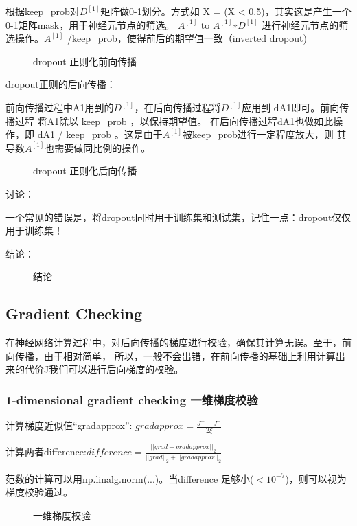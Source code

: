 \documentclass[UTF8]{ctexart}
\begin{document}
根据keep\_prob对$D^{[1]}$矩阵做0-1划分。方式如 X = (X < 0.5)，其实这是产生一个0-1矩阵mask，用于神经元节点的筛选。
$A^{[1]}$ to $A^{[1]}$∗$D^{[1]}$ 进行神经元节点的筛选操作。$A^{[1]}$ /keep\_prob，使得前后的期望值一致（inverted dropout)
\begin{figure}[htb]
 \caption{dropout 正则化前向传播}
  \label{fig:22}
 \end{figure}

dropout正则的后向传播：

前向传播过程中A1用到的$D^{[1]}$，在后向传播过程将$D^{[1]}$应用到 dA1即可。前向传播过程 将A1除以 keep\_prob ，以保持期望值。
在后向传播过程dA1也做如此操作，即 dA1 / keep\_prob 。这是由于$ A^{[1]}$被keep\_prob进行一定程度放大，则 其导数$ A^{[1]}$也需要做同比例的操作。
\begin{figure}[htb]
 \caption{dropout 正则化后向传播}
  \label{fig:23}
 \end{figure}

 讨论：

 一个常见的错误是，将dropout同时用于训练集和测试集，记住一点：dropout仅仅用于训练集！

结论：
\begin{figure}[htb]
 \caption{结论}
  \label{fig:24}
 \end{figure}

\subsection{Gradient Checking}
在神经网络计算过程中，对后向传播的梯度进行校验，确保其计算无误。至于，前向传播，由于相对简单，
所以，一般不会出错，在前向传播的基础上利用计算出来的代价J我们可以进行后向梯度的校验。

\subsubsection{1-dimensional gradient checking 一维梯度校验}
计算梯度近似值``gradapprox'': $gradapprox=\frac{J^{+}-J^{-}}{2\xi }$

计算两者difference:$difference=\frac{||grad-gradapprox||_{2}}{||grad||_{2}+||gradapprox||_{2}}$

范数的计算可以用np.linalg.norm(...)。当difference 足够小($<10^{−7}$)，则可以视为梯度校验通过。
\begin{figure}[htb]
 \caption{一维梯度校验}
  \label{fig:25}
 \end{figure}
\end{document}
